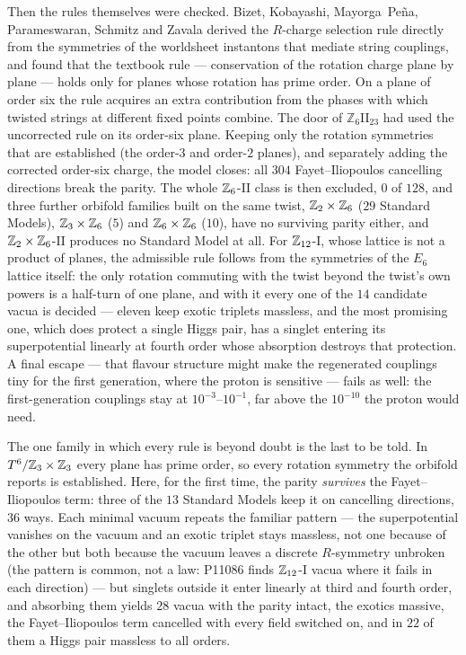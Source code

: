 Then the rules themselves were checked. Bizet, Kobayashi, Mayorga~Pe\~na, Parameswaran, Schmitz and
Zavala derived the $R$-charge selection rule directly from the symmetries of the worldsheet instantons
that mediate string couplings, and found that the textbook rule --- conservation of the rotation charge
plane by plane --- holds only for planes whose rotation has prime order. On a plane of order six the
rule acquires an extra contribution from the phases with which twisted strings at different fixed
points combine. The door of $\mathbb{Z}_6$II$_{23}$ had used the uncorrected rule on its order-six plane.
Keeping only the rotation symmetries that are established (the order-$3$ and order-$2$ planes), and
separately adding the corrected order-six charge, the model closes: all $304$ Fayet--Iliopoulos
cancelling directions break the parity. The whole $\mathbb{Z}_6$-II class is then excluded, $0$ of $128$, and
three further orbifold families built on the same twist, $\mathbb{Z}_2\times\mathbb{Z}_6$ ($29$ Standard Models),
$\mathbb{Z}_3\times\mathbb{Z}_6$ ($5$) and $\mathbb{Z}_6\times\mathbb{Z}_6$ ($10$), have no surviving parity either, and $\mathbb{Z}_2\times\mathbb{Z}_6$-II
produces no Standard Model at all. For $\mathbb{Z}_{12}$-I, whose lattice is not a product of planes, the admissible rule
follows from the symmetries of the $E_6$ lattice itself: the only rotation commuting with the twist beyond the
twist's own powers is a half-turn of one plane, and with it every one of the $14$ candidate vacua is decided ---
eleven keep exotic triplets massless, and the most promising one, which does protect a single Higgs pair, has a
singlet entering its superpotential linearly at fourth order whose absorption destroys that protection. A final
escape --- that flavour structure might make the regenerated couplings tiny for the first generation, where the
proton is sensitive --- fails as well: the first-generation couplings stay at $10^{-3}$--$10^{-1}$, far above the
$10^{-10}$ the proton would need.

The one family in which every rule is beyond doubt is the last to be told. In $T^6/\mathbb{Z}_3\times\mathbb{Z}_3$ every
plane has prime order, so every rotation symmetry the orbifold reports is established. Here, for the
first time, the parity \emph{survives} the Fayet--Iliopoulos term: three of the $13$ Standard Models keep it
on cancelling directions, $36$ ways. Each minimal vacuum repeats the familiar pattern --- the superpotential
vanishes on the vacuum and an exotic triplet stays massless, not one because of the other but both because the
vacuum leaves a discrete $R$-symmetry unbroken (the pattern is common, not a law: P11086 finds $\mathbb{Z}_{12}$-I vacua
where it fails in each direction) --- but singlets outside it enter linearly
at third and fourth order, and absorbing them yields $28$ vacua with the parity intact, the exotics
massive, the Fayet--Iliopoulos term cancelled with every field switched on, and in $22$ of them a Higgs
pair massless to all orders.

